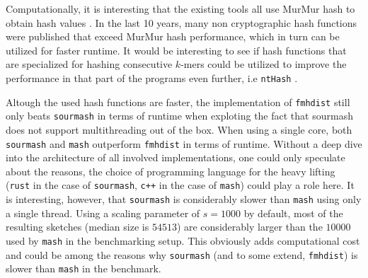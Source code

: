 Computationally, it is interesting that the existing tools all use MurMur hash
to obtain hash values
\cite{ondovMashFastGenome2016,bagciMicrobialPhylogeneticContext2021,irberLightweightCompositionalAnalysis2022}.
In the last 10 years, many non cryptographic hash functions were published that
exceed MurMur hash performance, which in turn can be utilized for faster
runtime. It would be interesting to see if hash functions that are specialized
for hashing consecutive $k$-mers could be utilized to improve the performance in
that part of the programs even further, i.e \texttt{ntHash}
\cite{mohamadiNtHashRecursiveNucleotide2016}.

Altough the used hash functions are faster, the implementation of
\texttt{fmhdist} still only beats \texttt{sourmash} in terms of runtime when
exploting the fact that sourmash does not support multithreading out of the box.
When using a single core, both \texttt{sourmash} and \texttt{mash} outperform
\texttt{fmhdist} in terms of runtime. Without a deep dive into the architecture
of all involved implementations, one could only speculate about the reasons, the
choice of programming language for the heavy lifting (\texttt{rust} in the case
of \texttt{sourmash}, \texttt{c++} in the case of \texttt{mash}) could play a
role here. It is interesting, however, that \texttt{sourmash} is considerably
slower than \texttt{mash} using only a single thread. Using a scaling parameter
of $s=1000$ by default, most of the resulting sketches (median size is $54513$)
are considerably larger than the $10000$ used by \texttt{mash} in the
benchmarking setup. This obviously adds computational cost and could be among
the reasons why \texttt{sourmash} (and to some extend, \texttt{fmhdist}) is
slower than \texttt{mash} in the benchmark.

\cleardoublepage

